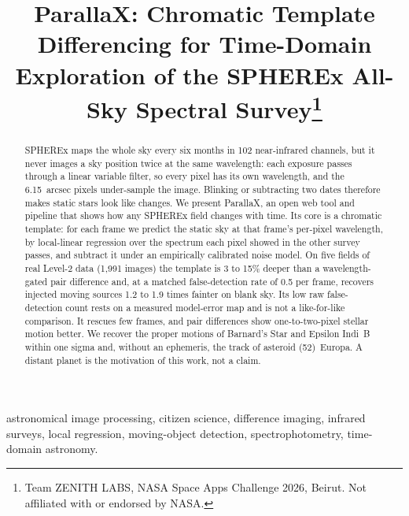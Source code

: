 \documentclass[conference]{IEEEtran}
\begin{document}
\title{ParallaX: Chromatic Template Differencing for Time-Domain Exploration of the SPHEREx All-Sky Spectral Survey\thanks{Team ZENITH LABS, NASA Space Apps Challenge 2026, Beirut. Not affiliated with or endorsed by NASA.}}

\author{
\and
{}
}

\maketitle


\begin{abstract}
SPHEREx maps the whole sky every six months in 102 near-infrared channels, but it never images a sky position twice at the same wavelength: each exposure passes through a linear variable filter, so every pixel has its own wavelength, and the 6.15~arcsec pixels under-sample the image. Blinking or subtracting two dates therefore makes static stars look like changes. We present ParallaX, an open web tool and pipeline that shows how any SPHEREx field changes with time. Its core is a chromatic template: for each frame we predict the static sky at that frame's per-pixel wavelength, by local-linear regression over the spectrum each pixel showed in the other survey passes, and subtract it under an empirically calibrated noise model. On five fields of real Level-2 data (1,991 images) the template is 3 to 15\% deeper than a wavelength-gated pair difference and, at a matched false-detection rate of 0.5 per frame, recovers injected moving sources 1.2 to 1.9 times fainter on blank sky. Its low raw false-detection count rests on a measured model-error map and is not a like-for-like comparison. It rescues few frames, and pair differences show one-to-two-pixel stellar motion better. We recover the proper motions of Barnard's Star and Epsilon Indi~B within one sigma and, without an ephemeris, the track of asteroid (52)~Europa. A distant planet is the motivation of this work, not a claim.
\end{abstract}

\begin{IEEEkeywords}
astronomical image processing, citizen science, difference imaging, infrared surveys, local regression, moving-object detection, spectrophotometry, time-domain astronomy.
\end{IEEEkeywords}
\end{document}
